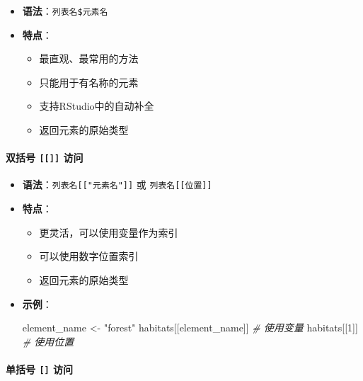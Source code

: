 \documentclass[
]{book}
\newenvironment{Shaded}{\begin{snugshade}}{\end{snugshade}}
\newcommand{\CommentTok}[1]{\textcolor[rgb]{0.56,0.35,0.01}{\textit{#1}}}
\newcommand{\DecValTok}[1]{\textcolor[rgb]{0.00,0.00,0.81}{#1}}
\newcommand{\NormalTok}[1]{#1}
\newcommand{\OtherTok}[1]{\textcolor[rgb]{0.56,0.35,0.01}{#1}}
\newcommand{\StringTok}[1]{\textcolor[rgb]{0.31,0.60,0.02}{#1}}
\providecommand{\tightlist}{%
  \setlength{\itemsep}{0pt}\setlength{\parskip}{0pt}}
\begin{document}
\begin{itemize}
\tightlist
\item
  \textbf{语法}：\texttt{列表名\$元素名}
\item
  \textbf{特点}：

  \begin{itemize}
  \tightlist
  \item
    最直观、最常用的方法
  \item
    只能用于有名称的元素
  \item
    支持RStudio中的自动补全
  \item
    返回元素的原始类型
  \end{itemize}
\end{itemize}

\hypertarget{ux53ccux62ecux53f7-ux8bbfux95ee}{%
\paragraph{\texorpdfstring{双括号 \texttt{{[}{[}{]}{]}} 访问}{双括号 {[}{[}{]}{]} 访问}}\label{ux53ccux62ecux53f7-ux8bbfux95ee}}

\begin{itemize}
\item
  \textbf{语法}：\texttt{列表名{[}{[}"元素名"{]}{]}} 或 \texttt{列表名{[}{[}位置{]}{]}}
\item
  \textbf{特点}：

  \begin{itemize}
  \tightlist
  \item
    更灵活，可以使用变量作为索引
  \item
    可以使用数字位置索引
  \item
    返回元素的原始类型
  \end{itemize}
\item
  \textbf{示例}：

\begin{Shaded}
\begin{Highlighting}[]
\NormalTok{element\_name }\OtherTok{\textless{}{-}} \StringTok{"forest"}
\NormalTok{habitats[[element\_name]]  }\CommentTok{\# 使用变量}
\NormalTok{habitats[[}\DecValTok{1}\NormalTok{]]             }\CommentTok{\# 使用位置}
\end{Highlighting}
\end{Shaded}
\end{itemize}

\hypertarget{ux5355ux62ecux53f7-ux8bbfux95ee}{%
\paragraph{\texorpdfstring{单括号 \texttt{{[}{]}} 访问}{单括号 {[}{]} 访问}}\label{ux5355ux62ecux53f7-ux8bbfux95ee}}
\end{document}
